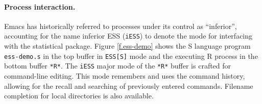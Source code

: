\documentclass{article}
\newcommand{\stexttt}[1]{{\small\texttt{#1}}}
\begin{document}
\paragraph{Process interaction.}
Emacs has historically referred to processes under its control as
``inferior'', accounting for the name inferior ESS (\stexttt{iESS}) to
denote the mode for interfacing with the statistical package.  Figure
\ref{f.ess-demo} shows the S language program \stexttt{ess-demo.s} in
the top buffer in \stexttt{ESS[S]} mode and the executing R process in
the bottom buffer \stexttt{*R*}.  The \stexttt{iESS} major mode of the
\stexttt{*R*} buffer is crafted for command-line editing.  This mode
remembers and uses the command history, allowing for the recall and
searching of previously entered commands.  Filename completion for
local directories is also available.
\end{document}
